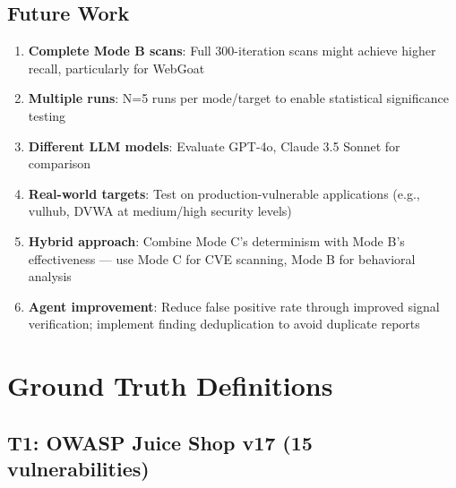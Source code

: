 \documentclass[12pt,a4paper,oneside]{book}
\begin{document}
\section{Future Work}

\begin{enumerate}
    \item \textbf{Complete Mode B scans}: Full 300-iteration scans might achieve higher recall, particularly for WebGoat
    
    \item \textbf{Multiple runs}: N=5 runs per mode/target to enable statistical significance testing
    
    \item \textbf{Different LLM models}: Evaluate GPT-4o, Claude 3.5 Sonnet for comparison
    
    \item \textbf{Real-world targets}: Test on production-vulnerable applications (e.g., vulhub, DVWA at medium/high security levels)
    
    \item \textbf{Hybrid approach}: Combine Mode C's determinism with Mode B's effectiveness — use Mode C for CVE scanning, Mode B for behavioral analysis
    
    \item \textbf{Agent improvement}: Reduce false positive rate through improved signal verification; implement finding deduplication to avoid duplicate reports
\end{enumerate}

\appendix
\appendixpage
\addappheadtotoc

\chapter{Ground Truth Definitions}

\section{T1: OWASP Juice Shop v17 (15 vulnerabilities)}
\end{document}
